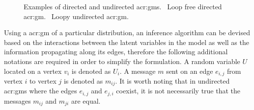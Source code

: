 \begin{figure}
  \centering
  {
  \hspace{1cm}
  }
  \caption[Examples of directed and undirected .]{Examples of directed and undirected \glspl{acr:gm}. \protect{}~Loop free directed \gls{acr:gm}. \protect{}~Loopy undirected \gls{acr:gm}.}
  \label{fig:gmExamples}
\end{figure}


Using a \gls{acr:gm} of a particular distribution, an inference algorithm can be devised based on the interactions between the latent variables in the model as well as the information propagating along its edges, therefore the following additional notations are required in order to simplify the formulation.
A random variable $U$ located on a vertex $v_i$ is denoted as $U_i$.
A message $m$ sent on an edge $e_{i,j}$ from vertex $i$ to vertex $j$ is denoted as $m_{ij}$.
It is worth noting that in undirected \glspl{acr:gm} where the edges $e_{i,j}$ and $e_{j,i}$ coexist, it is not necessarily true that the messages $m_{ij}$ and $m_{ji}$ are equal.

